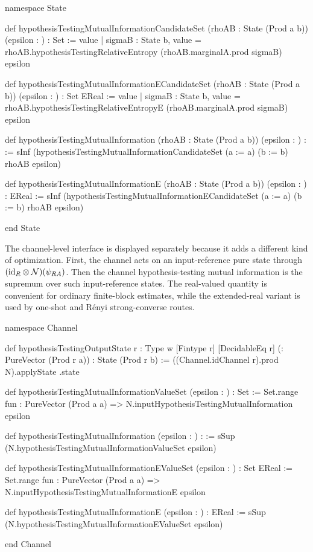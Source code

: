 \documentclass[10pt,a4paper]{article}
\begin{document}
\begin{qitleancode}[title={State-level hypothesis-testing information}]
namespace State

def hypothesisTestingMutualInformationCandidateSet
    (rhoAB : State (Prod a b)) (epsilon : \mathbbR) : Set \mathbbR :=
  {value | \exists sigmaB : State b,
    value = rhoAB.hypothesisTestingRelativeEntropy
      (rhoAB.marginalA.prod sigmaB) epsilon}

def hypothesisTestingMutualInformationECandidateSet
    (rhoAB : State (Prod a b)) (epsilon : \mathbbR) : Set EReal :=
  {value | \exists sigmaB : State b,
    value = rhoAB.hypothesisTestingRelativeEntropyE
      (rhoAB.marginalA.prod sigmaB) epsilon}

def hypothesisTestingMutualInformation
    (rhoAB : State (Prod a b)) (epsilon : \mathbbR) : \mathbbR :=
  sInf (hypothesisTestingMutualInformationCandidateSet (a := a) (b := b) rhoAB epsilon)

def hypothesisTestingMutualInformationE
    (rhoAB : State (Prod a b)) (epsilon : \mathbbR) : EReal :=
  sInf (hypothesisTestingMutualInformationECandidateSet (a := a) (b := b) rhoAB epsilon)

end State
\end{qitleancode}
	
The channel-level interface is displayed separately because it adds a
different kind of optimization.  First, the channel acts on an
input-reference pure state through $({\operatorname{id}}_R\otimes{\cal N})(\psi_{RA})$.  Then the
channel hypothesis-testing mutual information is the supremum over such
input-reference states.  The real-valued quantity is convenient for ordinary
finite-block estimates, while the extended-real variant is used by one-shot
and R\'enyi strong-converse routes.
	
\begin{qitleancode}[title={Channel-level hypothesis-testing information}]
namespace Channel

def hypothesisTestingOutputState {r : Type w} [Fintype r] [DecidableEq r]
    (\psi : PureVector (Prod r a)) : State (Prod r b) :=
  ((Channel.idChannel r).prod N).applyState \psi.state

def hypothesisTestingMutualInformationValueSet (epsilon : \mathbbR) : Set \mathbbR :=
  Set.range fun \psi : PureVector (Prod a a) =>
    N.inputHypothesisTestingMutualInformation \psi epsilon

def hypothesisTestingMutualInformation (epsilon : \mathbbR) : \mathbbR :=
  sSup (N.hypothesisTestingMutualInformationValueSet epsilon)

def hypothesisTestingMutualInformationEValueSet (epsilon : \mathbbR) : Set EReal :=
  Set.range fun \psi : PureVector (Prod a a) =>
    N.inputHypothesisTestingMutualInformationE \psi epsilon

def hypothesisTestingMutualInformationE (epsilon : \mathbbR) : EReal :=
  sSup (N.hypothesisTestingMutualInformationEValueSet epsilon)

end Channel
\end{qitleancode}
	
\end{document}

